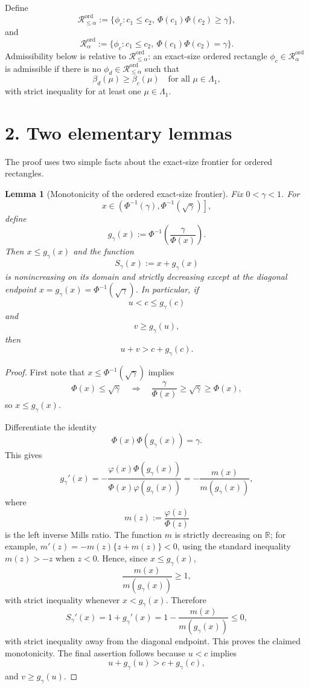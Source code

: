 \documentclass[12pt]{article}
\newtheorem{lemma}{Lemma}
\theoremstyle{definition}
\theoremstyle{remark}
\begin{document}
Define
\[
\mathcal R^{\mathrm{ord}}_{\le\alpha}
:=
\{\phi_c:c_1\le c_2,\ \Phi(c_1)\Phi(c_2)\ge \gamma\},
\]
and
\[
\mathcal R^{\mathrm{ord}}_{\alpha}
:=
\{\phi_c:c_1\le c_2,\ \Phi(c_1)\Phi(c_2)= \gamma\}.
\]
Admissibility below is relative to $\mathcal R^{\mathrm{ord}}_{\le\alpha}$: an exact-size ordered rectangle $\phi_c\in\mathcal R^{\mathrm{ord}}_{\alpha}$ is admissible if there is no $\phi_d\in\mathcal R^{\mathrm{ord}}_{\le\alpha}$ such that
\[
\beta_d(\mu)\ge \beta_c(\mu)
\quad\text{for all }\mu\in\Lambda_1,
\]
with strict inequality for at least one $\mu\in\Lambda_1$.

\section*{2. Two elementary lemmas}

The proof uses two simple facts about the exact-size frontier for ordered rectangles.

\begin{lemma}[Monotonicity of the ordered exact-size frontier]\label{lem:frontier-sum}
Fix $0<\gamma<1$.  For
\[
x\in\left(\Phi^{-1}(\gamma),\Phi^{-1}(\sqrt{\gamma})\right],
\]
define
\[
g_\gamma(x):=\Phi^{-1}\!\left(\frac{\gamma}{\Phi(x)}\right).
\]
Then $x\le g_\gamma(x)$ and the function
\[
S_\gamma(x):=x+g_\gamma(x)
\]
is nonincreasing on its domain and strictly decreasing except at the diagonal endpoint $x=g_\gamma(x)=\Phi^{-1}(\sqrt{\gamma})$.
In particular, if
\[
u<c\le g_\gamma(c)
\]
and
\[
v\ge g_\gamma(u),
\]
then
\begin{equation}\label{eq:sum-increase}
u+v>c+g_\gamma(c).
\end{equation}
\end{lemma}

\begin{proof}
First note that $x\le \Phi^{-1}(\sqrt{\gamma})$ implies
\[
\Phi(x)\le\sqrt{\gamma}
\quad\Longrightarrow\quad
\frac{\gamma}{\Phi(x)}\ge\sqrt{\gamma}\ge\Phi(x),
\]
so $x\le g_\gamma(x)$.

Differentiate the identity
\[
\Phi(x)\Phi(g_\gamma(x))=\gamma.
\]
This gives
\[
g_\gamma'(x)
=-\frac{\varphi(x)\Phi(g_\gamma(x))}{\Phi(x)\varphi(g_\gamma(x))}
=-\frac{m(x)}{m(g_\gamma(x))},
\]
where
\[
m(z):=\frac{\varphi(z)}{\Phi(z)}
\]
is the left inverse Mills ratio.  The function $m$ is strictly decreasing on $\mathbb R$; for example, \(m'(z)=-m(z)\{z+m(z)\}<0\), using the standard inequality \(m(z)>-z\) when \(z<0\).  Hence, since $x\le g_\gamma(x)$,
\[
\frac{m(x)}{m(g_\gamma(x))}\ge1,
\]
with strict inequality whenever $x<g_\gamma(x)$. Therefore
\[
S_\gamma'(x)=1+g_\gamma'(x)
=1-\frac{m(x)}{m(g_\gamma(x))}
\le0,
\]
with strict inequality away from the diagonal endpoint. This proves the claimed monotonicity. The final assertion follows because $u<c$ implies
\[
u+g_\gamma(u)>c+g_\gamma(c),
\]
and $v\ge g_\gamma(u)$.
\end{proof}
\end{document}
